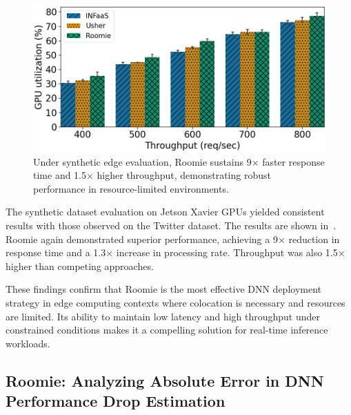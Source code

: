 \begin{figure}
\begin{minipage}[t]{.24\linewidth}
	\end{minipage}
	\hfill
	\begin{minipage}[t]{.24\linewidth}
		\centering
		\includegraphics[width=\linewidth]{chapters/roomie/images/JetsonNano/synthetic-all-models/gpu_utilization.png}
	\end{minipage}
	\caption{Under synthetic edge evaluation, Roomie sustains 9× faster response time and 1.5× higher throughput, demonstrating robust performance in resource-limited environments.}
	\label{fig:JetsonNano/synthetic-all-models}
	\vspace{-3mm}
\end{figure}

The synthetic dataset evaluation on Jetson Xavier GPUs yielded consistent results with those observed on the Twitter dataset. The results are shown in~. Roomie again demonstrated superior performance, achieving a 9× reduction in response time and a 1.3× increase in processing rate. Throughput was also 1.5× higher than competing approaches.

These findings confirm that Roomie is the most effective DNN deployment strategy in edge computing contexts where colocation is necessary and resources are limited. Its ability to maintain low latency and high throughput under constrained conditions makes it a compelling solution for real-time inference workloads.


\subsection{Roomie: Analyzing Absolute Error in DNN Performance Drop Estimation}

